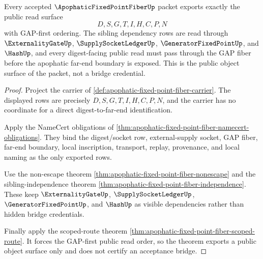 \begin{theorem}
\label{thm:apophatic-fixed-point-fiber-public-export-surface}
Every accepted $\ApophaticFixedPointFiberUp$ packet exports exactly the public read surface
$$
D,S,G,T,I,H,C,P,N
$$
with GAP-first ordering. The sibling dependency rows are read through $\ExternalityGateUp$, $\SupplySocketLedgerUp$, $\GeneratorFixedPointUp$, and $\HashUp$, and every digest-facing public read must pass through the GAP fiber before the apophatic far-end boundary is exposed. This is the public object surface of the packet, not a bridge credential.
\end{theorem}
\begin{proof}
Project the carrier of \autoref{def:apophatic-fixed-point-fiber-carrier}. The displayed rows are precisely $D,S,G,T,I,H,C,P,N$, and the carrier has no coordinate for a direct digest-to-far-end identification.

Apply the NameCert obligations of \autoref{thm:apophatic-fixed-point-fiber-namecert-obligations}. They bind the digest/socket row, external-supply socket, GAP fiber, far-end boundary, local inscription, transport, replay, provenance, and local naming as the only exported rows.

Use the non-escape theorem \autoref{thm:apophatic-fixed-point-fiber-nonescape} and the sibling-independence theorem \autoref{thm:apophatic-fixed-point-fiber-independence}. These keep $\ExternalityGateUp$, $\SupplySocketLedgerUp$, $\GeneratorFixedPointUp$, and $\HashUp$ as visible dependencies rather than hidden bridge credentials.

Finally apply the scoped-route theorem \autoref{thm:apophatic-fixed-point-fiber-scoped-route}. It forces the GAP-first public read order, so the theorem exports a public object surface only and does not certify an acceptance bridge.
\end{proof}

